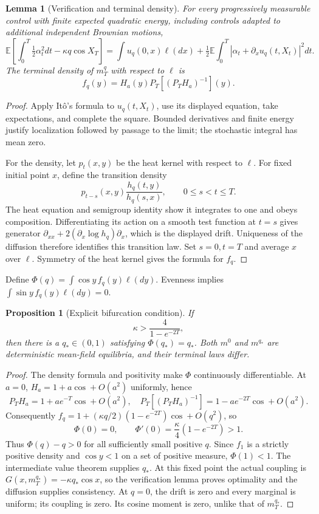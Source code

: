 \documentclass[11pt,a4paper]{article}
\newtheorem{proposition}[theorem]{Proposition}
\newtheorem{lemma}[theorem]{Lemma}
\theoremstyle{remark}
\newcommand{\E}{\mathbb E}
\begin{document}
\begin{lemma}[Verification and terminal density]
For every progressively measurable control with finite expected quadratic energy, including controls adapted to additional independent Brownian motions,
\[
 \E\left[\int_0^T\tfrac12\alpha_t^2dt-\kappa q\cos X_T\right]
 =\int u_q(0,x)\ell(dx)
 +\tfrac12\E\int_0^T|\alpha_t+\partial_xu_q(t,X_t)|^2dt.
\]
The terminal density of $m_T^q$ with respect to $\ell$ is
\[
 f_q(y)=H_a(y)P_T\left[(P_TH_a)^{-1}\right](y).
\]
\end{lemma}
\begin{proof}
Apply It\^o's formula to $u_q(t,X_t)$, use its displayed equation, take expectations, and complete the square. Bounded derivatives and finite energy justify localization followed by passage to the limit; the stochastic integral has mean zero.

For the density, let $p_t(x,y)$ be the heat kernel with respect to $\ell$. For fixed initial point $x$, define the transition density
\[
 p_{t-s}(x,y)\frac{h_q(t,y)}{h_q(s,x)},\qquad 0\le s<t\le T.
\]
The heat equation and semigroup identity show it integrates to one and obeys composition. Differentiating its action on a smooth test function at $t=s$ gives generator $\partial_{xx}+2(\partial_x\log h_q)\partial_x$, which is the displayed drift. Uniqueness of the diffusion therefore identifies this transition law. Set $s=0,t=T$ and average $x$ over $\ell$. Symmetry of the heat kernel gives the formula for $f_q$.
\end{proof}

Define $\Phi(q)=\int\cos y\,f_q(y)\ell(dy)$. Evenness implies $\int\sin y\,f_q(y)\ell(dy)=0$.

\begin{proposition}[Explicit bifurcation condition]
If
\[
 \kappa>\frac{4}{1-e^{-2T}},
\]
then there is a $q_*\in(0,1)$ satisfying $\Phi(q_*)=q_*$. Both $m^0$ and $m^{q_*}$ are deterministic mean-field equilibria, and their terminal laws differ.
\end{proposition}
\begin{proof}
The density formula and positivity make $\Phi$ continuously differentiable. At $a=0$, $H_a=1+a\cos+O(a^2)$ uniformly, hence
\[
 P_TH_a=1+ae^{-T}\cos+O(a^2),\quad
 P_T[(P_TH_a)^{-1}]=1-ae^{-2T}\cos+O(a^2).
\]
Consequently $f_q=1+(\kappa q/2)(1-e^{-2T})\cos+O(q^2)$, so
\[
 \Phi(0)=0,\qquad \Phi'(0)=\frac\kappa4(1-e^{-2T})>1.
\]
Thus $\Phi(q)-q>0$ for all sufficiently small positive $q$. Since $f_1$ is a strictly positive density and $\cos y<1$ on a set of positive measure, $\Phi(1)<1$. The intermediate value theorem supplies $q_*$. At this fixed point the actual coupling is $G(x,m_T^{q_*})=-\kappa q_*\cos x$, so the verification lemma proves optimality and the diffusion supplies consistency. At $q=0$, the drift is zero and every marginal is uniform; its coupling is zero. Its cosine moment is zero, unlike that of $m_T^{q_*}$.
\end{proof}
\end{document}
